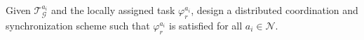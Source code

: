\begin{problem}\label{problem:task}
Given $\mathcal{T}_{\mathcal{G}}^{a_i}$ and the locally assigned task $\varphi^{a_i}_r$, design a distributed coordination and synchronization scheme such that $\varphi^{a_i}_r$ is satisfied for all $a_i \in \mathcal{N}$.%
\end{problem}

